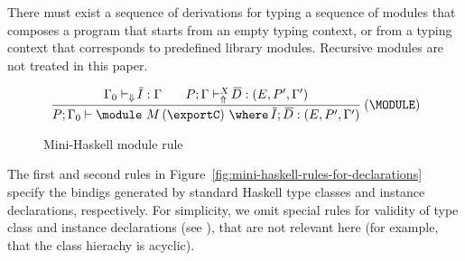 There must exist a sequence of derivations for typing a sequence of
modules that composes a program that starts from an empty typing
context, or from a typing context that corresponds to predefined
library modules. Recursive modules are not treated in this paper.


\begin{figure}[b]
\begin{mdframed}
\[ \begin{array}{cc}
	\displaystyle\frac
	 {\begin{array}{ll}
           \Gamma_0 \vdash_{\Downarrow} \overline{\!I} : \Gamma\:\: & \:\:P;\Gamma \vdash_{\Uparrow}^X \overline{\!D} : (E,P',\Gamma') 
          \end{array}}
	 {P;\Gamma_0 \vdash \module\ M\, (\exportC)\ \where\ \overline{\!I};\, \overline{\!D} : (E,P',\Gamma')} \:(\MODULE)
\end{array} \]
\end{mdframed} \vspace{-.2cm}
\caption{Mini-Haskell module rule} 
\label{fig:mini-haskell-module-rule}
\end{figure}

The first and second rules in
Figure~\ref{fig:mini-haskell-rules-for-declarations} specify the
bindigs generated by standard Haskell type classes and instance
declarations, respectively. 
For simplicity, we omit special rules for validity of type class and instance declarations (see \cite{GHC}), that are not relevant here (for example, that the class hierachy is acyclic).

